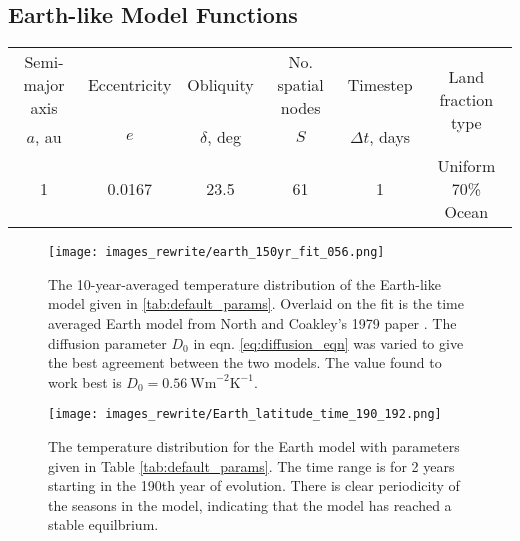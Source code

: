 \documentclass[12pt, onecolumn]{revtex4-2}    %
\newcommand{\diffusion}{\ensuremath{\ \text{Wm}^{-2} \text{K}^{-1}}}
\newcommand{\degrees}{\ensuremath{^{\circ}}}
\begin{document}
\subsection{Earth-like Model Functions} \label{ssec:EarthLikeModel}
%
\begin{table*}
  \begin{tabular}{|c|c|c|c|c|c|}
    \hline
    Semi-major axis & Eccentricity & Obliquity     & No. spatial nodes & Timestep         & \multirow{2}{*}{Land fraction type} \\
    $a$, au       & $e$          & $\delta$, deg & $S$               & $\Delta t$, days &                                     \\
    \hline
    1             & 0.0167       & 23.5          & 61                & 1                & Uniform 70\% Ocean                  \\
    \hline
  \end{tabular}
  \caption{A summary of the default parameters for the Earth-like model.
    A `Uniform' land fraction indicates that the model has the same ratio of land to ocean across the entire planet.
    The odd number of spatial nodes means there is a true equator with $\lambda = 0$ as well as poles with $\lambda = \pm 90\degrees$}
  \label{tab:default_params}
\end{table*}

\begin{figure}[t]
  \texttt{[image: images\_rewrite/earth\_150yr\_fit\_056.png]}
  \caption{
    The 10-year-averaged temperature distribution of the Earth-like model given in \ref{tab:default_params}.
    Overlaid on the fit is the time averaged Earth model from North and Coakley's 1979 paper \cite{NC79}.
    The diffusion parameter $D_0$ in eqn. \eqref{eq:diffusion_eqn} was varied to give the best agreement between the two models.
    The value found to work best is $D_0 = 0.56 \diffusion$.
  }
  \label{fig:NC_fit}
\end{figure}

\begin{figure}[t]
  \texttt{[image: images\_rewrite/Earth\_latitude\_time\_190\_192.png]}
  \caption{
    The temperature distribution for the Earth model with parameters given in Table \ref{tab:default_params}.
    The time range is for 2 years starting in the 190th year of evolution.
    There is clear periodicity of the seasons in the model, indicating that the model has reached a stable equilbrium.
  }
  \label{fig:Earth_temperature_dist}
\end{figure}
\end{document}
